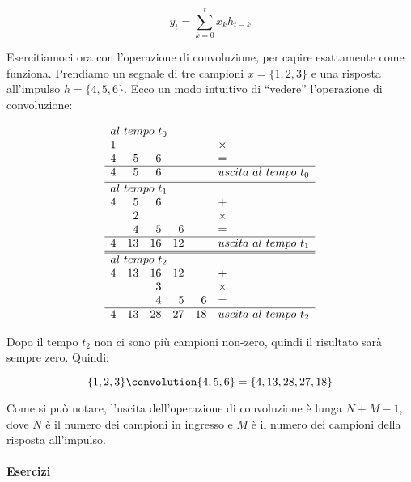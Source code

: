 \begin{equation}
  y_t = \sum_{k = 0}^{t}{x_k h_{t-k}}
\end{equation}

Esercitiamoci ora con l'operazione di convoluzione, per capire esattamente
come funziona. Prendiamo un segnale di tre campioni $x = \{ 1, 2, 3 \}$ e una
risposta all'impulso $h = \{ 4, 5, 6 \}$. Ecco un modo intuitivo di ``vedere''
l'operazione di convoluzione:

\begin{equation}
  \begin{array}{*{5}{r} l}
  \multicolumn{6}{l}{al~tempo~t_{0}}\\
  1 & & & & & \times\\
  4 & 5 & 6 & & & =\\
  \hline
	4 & 5 & 6 & & & uscita~al~tempo~t_{0}\\
  \hline\hline
  \multicolumn{6}{l}{al~tempo~t_{1}}\\
  4 & 5 & 6 & & & +\\
    & 2 & & & & \times\\
    & 4 & 5 & 6 & & =\\
  \hline
  4 & 13 & 16 & 12 & & uscita~al~tempo~t_{1}\\
  \hline\hline
  \multicolumn{6}{l}{al~tempo~t_{2}}\\
  4 & 13 & 16 & 12 & &  +\\
  &  & 3  & & & \times\\
  &  & 4  & 5 & 6 & =\\
  \hline
  4 & 13 & 28 & 27 & 18 & uscita~al~tempo~t_{2}\\ 
\end{array}
\end{equation}

Dopo il tempo $t_2$ non ci sono pi\`u campioni non-zero, quindi il risultato
sar\`a sempre zero. Quindi:

\begin{equation}
  \{ 1, 2, 3 \} \convolution \{ 4, 5, 6 \} = \{ 4, 13, 28, 27, 18 \}
\end{equation}

Come si pu\`o notare, l'uscita dell'operazione di convoluzione \`e lunga $N + M - 1$,
dove $N$ \`e il numero dei campioni in ingresso e $M$ \`e il numero dei campioni della risposta all'impulso.

\paragraph{Esercizi}

